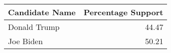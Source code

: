 \begin{tabular}{lr}
\toprule
Candidate Name & Percentage Support \\
\midrule
Donald Trump & 44.47 \\
Joe Biden & 50.21 \\
\bottomrule
\end{tabular}

